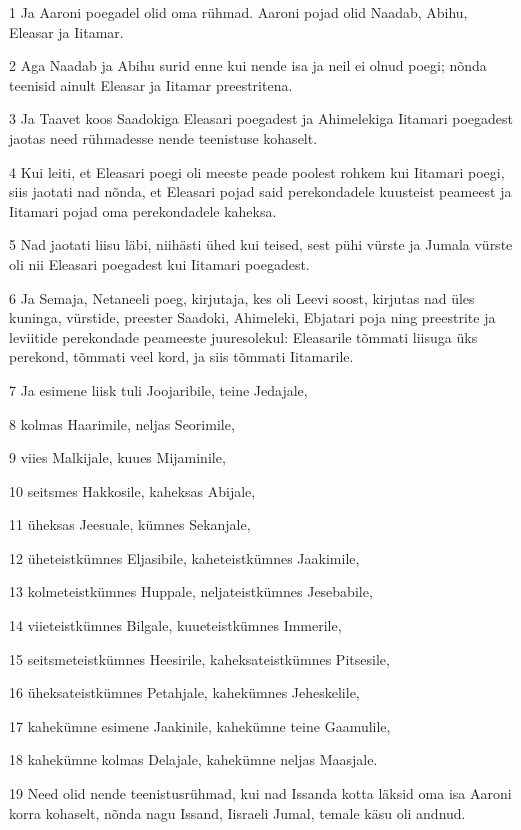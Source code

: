 \par 1 Ja Aaroni poegadel olid oma rühmad. Aaroni pojad olid Naadab, Abihu, Eleasar ja Iitamar.
\par 2 Aga Naadab ja Abihu surid enne kui nende isa ja neil ei olnud poegi; nõnda teenisid ainult Eleasar ja Iitamar preestritena.
\par 3 Ja Taavet koos Saadokiga Eleasari poegadest ja Ahimelekiga Iitamari poegadest jaotas need rühmadesse nende teenistuse kohaselt.
\par 4 Kui leiti, et Eleasari poegi oli meeste peade poolest rohkem kui Iitamari poegi, siis jaotati nad nõnda, et Eleasari pojad said perekondadele kuusteist peameest ja Iitamari pojad oma perekondadele kaheksa.
\par 5 Nad jaotati liisu läbi, niihästi ühed kui teised, sest pühi vürste ja Jumala vürste oli nii Eleasari poegadest kui Iitamari poegadest.
\par 6 Ja Semaja, Netaneeli poeg, kirjutaja, kes oli Leevi soost, kirjutas nad üles kuninga, vürstide, preester Saadoki, Ahimeleki, Ebjatari poja ning preestrite ja leviitide perekondade peameeste juuresolekul: Eleasarile tõmmati liisuga üks perekond, tõmmati veel kord, ja siis tõmmati Iitamarile.
\par 7 Ja esimene liisk tuli Joojaribile, teine Jedajale,
\par 8 kolmas Haarimile, neljas Seorimile,
\par 9 viies Malkijale, kuues Mijaminile,
\par 10 seitsmes Hakkosile, kaheksas Abijale,
\par 11 üheksas Jeesuale, kümnes Sekanjale,
\par 12 üheteistkümnes Eljasibile, kaheteistkümnes Jaakimile,
\par 13 kolmeteistkümnes Huppale, neljateistkümnes Jesebabile,
\par 14 viieteistkümnes Bilgale, kuueteistkümnes Immerile,
\par 15 seitsmeteistkümnes Heesirile, kaheksateistkümnes Pitsesile,
\par 16 üheksateistkümnes Petahjale, kahekümnes Jeheskelile,
\par 17 kahekümne esimene Jaakinile, kahekümne teine Gaamulile,
\par 18 kahekümne kolmas Delajale, kahekümne neljas Maasjale.
\par 19 Need olid nende teenistusrühmad, kui nad Issanda kotta läksid oma isa Aaroni korra kohaselt, nõnda nagu Issand, Iisraeli Jumal, temale käsu oli andnud.
